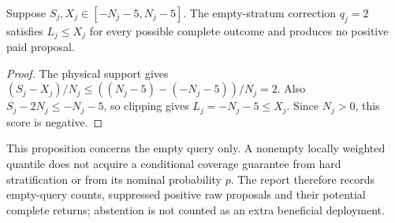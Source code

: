 \begin{proposition}
\label{prop:v2-support-fallback}
Suppose $S_j,X_j\in[-N_j-5,N_j-5]$. The empty-stratum correction
$q_j=2$ satisfies $L_j\leq X_j$ for every possible complete outcome
and produces no positive paid proposal.
\end{proposition}
\begin{proof}
The physical support gives
$(S_j-X_j)/N_j\leq((N_j-5)-(-N_j-5))/N_j=2$.
Also $S_j-2N_j\leq-N_j-5$, so clipping gives
$L_j=-N_j-5\leq X_j$. Since $N_j>0$, this score is negative.
\end{proof}
This proposition concerns the empty query only. A nonempty locally
weighted quantile does not acquire a conditional coverage guarantee
from hard stratification or from its nominal probability $p$.
The report therefore records empty-query counts, suppressed positive
raw proposals and their potential complete returns; abstention is not
counted as an extra beneficial deployment.

